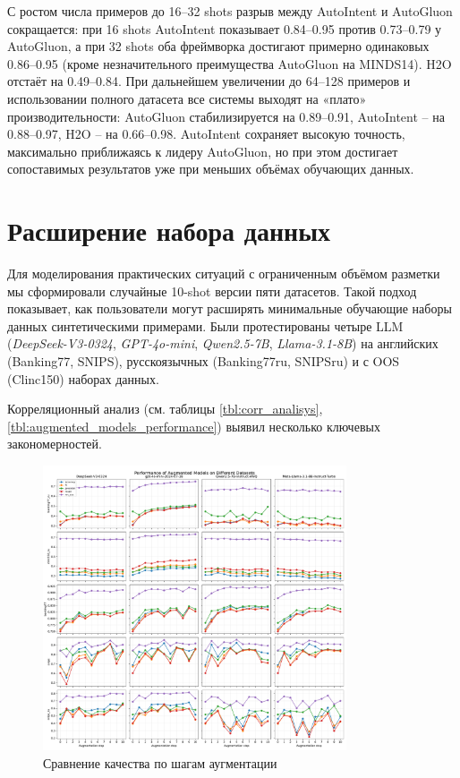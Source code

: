 \documentclass[14pt,a4paper,oneside,openany]{extbook}
\begin{document}
С ростом числа примеров до 16–32 shots разрыв между AutoIntent и AutoGluon сокращается: при 16 shots AutoIntent показывает 0.84–0.95 против 0.73–0.79 у AutoGluon, а при 32 shots оба фреймворка достигают примерно одинаковых 0.86–0.95 (кроме незначительного преимущества AutoGluon на MINDS14). H2O отстаёт на 0.49–0.84. При дальнейшем увеличении до 64–128 примеров и использовании полного датасета все системы выходят на «плато» производительности: AutoGluon стабилизируется на 0.89–0.91, AutoIntent – на 0.88–0.97, H2O – на 0.66–0.98. AutoIntent сохраняет высокую точность, максимально приближаясь к лидеру AutoGluon, но при этом достигает сопоставимых результатов уже при меньших объёмах обучающих данных.
\section{Расширение набора данных}
\label{sec:org77879df}
Для моделирования практических ситуаций с ограниченным объёмом разметки мы сформировали случайные 10-shot версии пяти датасетов. Такой подход показывает, как пользователи могут расширять минимальные обучающие наборы данных синтетическими примерами. Были протестированы четыре LLM (\emph{DeepSeek-V3-0324}\autocite{deepseek-ai_deepseekv3_2025}, \emph{GPT-4o-mini}\autocite{openai_gpt4o_2024}, \emph{Qwen2.5-7B}\autocite{yang_qwen2_2024}, \emph{Llama-3.1-8B}\autocite{dubey_llama_2024}) на английских (Banking77, SNIPS), русскоязычных (Banking77ru, SNIPSru) и с OOS (Clinc150) наборах данных.

Корреляционный анализ (см. таблицы \ref{tbl:corr_analisys}, \ref{tbl:augmented_models_performance}) выявил несколько ключевых закономерностей.
\begin{figure}[h!]
\centering
\includegraphics[width=0.8\textwidth]{img/augmented_models_performance.pdf}
\caption{\label{fig:augmented_models_performance}Сравнение качества по шагам аугментации}
\end{figure}
\end{document}
